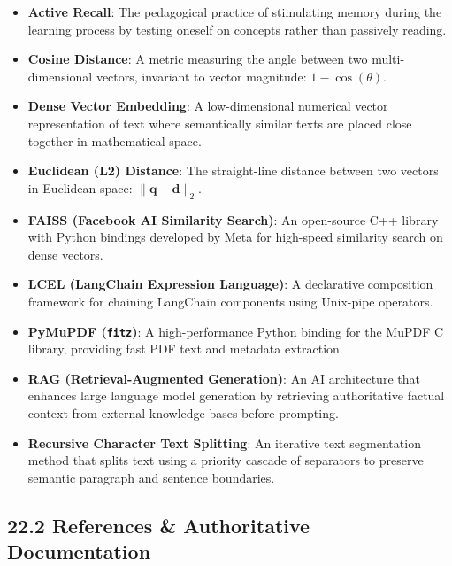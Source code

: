 \documentclass[
]{article}
\providecommand{\tightlist}{%
  \setlength{\itemsep}{0pt}\setlength{\parskip}{0pt}}
\begin{document}
\begin{itemize}
\tightlist
\item
  \textbf{Active Recall}: The pedagogical practice of stimulating memory
  during the learning process by testing oneself on concepts rather than
  passively reading.
\item
  \textbf{Cosine Distance}: A metric measuring the angle between two
  multi-dimensional vectors, invariant to vector magnitude:
  \(1 - \cos(\theta)\).
\item
  \textbf{Dense Vector Embedding}: A low-dimensional numerical vector
  representation of text where semantically similar texts are placed
  close together in mathematical space.
\item
  \textbf{Euclidean (L2) Distance}: The straight-line distance between
  two vectors in Euclidean space: \(\|\mathbf{q} - \mathbf{d}\|_2\).
\item
  \textbf{FAISS (Facebook AI Similarity Search)}: An open-source C++
  library with Python bindings developed by Meta for high-speed
  similarity search on dense vectors.
\item
  \textbf{LCEL (LangChain Expression Language)}: A declarative
  composition framework for chaining LangChain components using
  Unix-pipe operators.
\item
  \textbf{PyMuPDF (\texttt{fitz})}: A high-performance Python binding
  for the MuPDF C library, providing fast PDF text and metadata
  extraction.
\item
  \textbf{RAG (Retrieval-Augmented Generation)}: An AI architecture that
  enhances large language model generation by retrieving authoritative
  factual context from external knowledge bases before prompting.
\item
  \textbf{Recursive Character Text Splitting}: An iterative text
  segmentation method that splits text using a priority cascade of
  separators to preserve semantic paragraph and sentence boundaries.
\end{itemize}

\subsection{22.2 References \& Authoritative
Documentation}\label{references-authoritative-documentation}
\end{document}
